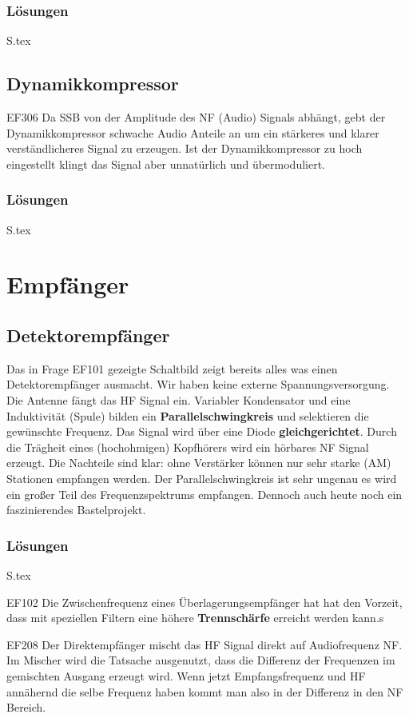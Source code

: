 \documentclass[10pt,a4paper,ngerman]{article}
\theoremstyle{definition}
\theoremstyle{plain}
\theoremstyle{mytheorem}
\theoremstyle{definition}
\newenvironment{ohmchapter}{}
{
  \subsubsection*{Lösungen}
  S\arabic{subsection}.tex}
}
\begin{document}
\begin{ohmchapter}
\end{ohmchapter}  

\subsection{Dynamikkompressor}

\begin{sol}{EF306}
  Da SSB von der Amplitude des NF (Audio) Signals abhängt, gebt der Dynamikkompressor schwache Audio Anteile an um ein stärkeres und klarer verständlicheres Signal zu erzeugen. Ist der Dynamikkompressor zu hoch eingestellt klingt das Signal aber unnatürlich und übermoduliert.
\end{sol} 
\begin{ohmchapter}
\end{ohmchapter}  
\section{Empfänger}
\subsection{Detektorempfänger}
\begin{ohmchapter}
  Das in Frage EF101 gezeigte Schaltbild zeigt bereits alles was einen Detektorempfänger ausmacht. Wir haben keine externe Spannungsversorgung. Die Antenne fängt das HF Signal ein. Variabler Kondensator und eine Induktivität (Spule) bilden ein \textbf{Parallelschwingkreis} und selektieren die gewünschte Frequenz.
  Das Signal wird über eine Diode \textbf{gleichgerichtet}. Durch die Trägheit eines (hochohmigen) Kopfhörers wird ein hörbares NF Signal erzeugt.
  Die Nachteile sind klar: ohne Verstärker können nur sehr starke (AM) Stationen empfangen werden. Der Parallelschwingkreis ist sehr ungenau es wird ein großer Teil des Frequenzspektrums empfangen.
   Dennoch auch heute noch ein faszinierendes Bastelprojekt.
  
\end{ohmchapter}  


\begin{sol}{EF102}
  Die Zwischenfrequenz eines Überlagerungsempfänger hat hat den Vorzeit, dass mit speziellen Filtern eine höhere \textbf{Trennschärfe} erreicht werden kann.s
\end{sol} 

\begin{sol}{EF208}
 Der Direktempfänger mischt das HF Signal direkt auf Audiofrequenz NF. Im Mischer wird die Tatsache ausgenutzt, dass die Differenz der Frequenzen im gemischten Ausgang erzeugt wird. 
 Wenn jetzt Empfangsfrequenz und HF annähernd die selbe Frequenz haben kommt man also in der Differenz in den NF Bereich.
\end{sol} 
\end{document}

